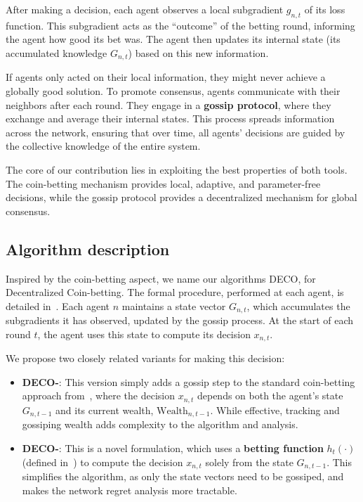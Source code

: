 \documentclass[journal]{IEEEtran} %
\newcommand{\w}{\text{Wealth}}
\newcommand{\algname}{{DECO}\xspace}
\begin{document}
After making a decision, each agent observes a local subgradient $g_{n,t}$ of its loss function.
This subgradient acts as the ``outcome'' of the betting round, informing the agent how good its bet was.
The agent then updates its internal state (its accumulated knowledge $G_{n,t}$) based on this new information.

If agents only acted on their local information, they might never achieve a globally good solution.
To promote consensus, agents communicate with their neighbors after each round.
They engage in a \textbf{gossip protocol}, where they exchange and average their internal states.
This process spreads information across the network, ensuring that over time, all agents' decisions are guided by the collective knowledge of the entire system.

The core of our contribution lies in exploiting the best properties of both tools.
The coin-betting mechanism provides local, adaptive, and parameter-free decisions, while the gossip protocol provides a decentralized mechanism for global consensus.

\subsection{Algorithm description}
Inspired by the coin-betting aspect, we name our algorithms \algname{}, for Decentralized Coin-betting.
The formal procedure, performed at each agent, is detailed in~.
Each agent $n$ maintains a state vector $G_{n,t}$, which accumulates the subgradients it has observed, updated by the gossip process.
At the start of each round $t$, the agent uses this state to compute its decision $x_{n,t}$.

We propose two closely related variants for making this decision:
\begin{itemize}
    \item \textbf{\algname{}-}: This version simply adds a gossip step to the standard coin-betting approach from~\cite{orabona_coin_2016}, where the decision $x_{n,t}$ depends on both the agent's state $G_{n,t-1}$ and its current wealth, $\w_{n,t-1}$.
          While effective, tracking and gossiping wealth adds complexity to the algorithm and analysis.
    \item \textbf{\algname{}-}: This is a novel formulation, which uses a \textbf{betting function} $h_t(\cdot)$ (defined in~) to compute the decision $x_{n,t}$ solely from the state $G_{n,t-1}$.
          This simplifies the algorithm, as only the state vectors need to be gossiped, and makes the network regret analysis more tractable.
\end{itemize}
\end{document}
